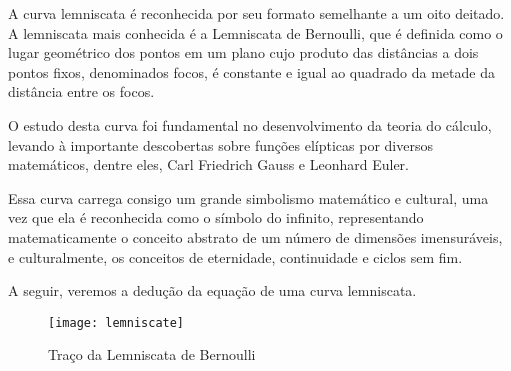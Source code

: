 \documentclass[../resumo.tex]{subfiles}
\begin{document}
	A curva lemniscata é reconhecida por seu formato semelhante a um oito deitado. A lemniscata mais conhecida é
	a Lemniscata de Bernoulli, que é definida como o lugar geométrico dos pontos em um plano cujo produto
	das distâncias a dois pontos fixos, denominados focos, é constante e igual ao quadrado da metade da distância
	entre os focos.

	O estudo desta curva foi fundamental no desenvolvimento da teoria do cálculo, levando à importante
	descobertas sobre funções elípticas por diversos matemáticos, dentre eles, Carl Friedrich Gauss e 
	Leonhard Euler.

	Essa curva carrega consigo um grande simbolismo matemático e cultural, uma vez que ela é reconhecida como
	o símbolo do infinito, representando matematicamente o conceito abstrato de um número de dimensões
	imensuráveis, e culturalmente, os conceitos de eternidade, continuidade e ciclos sem fim. 

	A seguir, veremos a dedução da equação de uma curva lemniscata.

	\begin{figure}[H]
			\centering
			\texttt{[image: lemniscate]}
			\caption{Traço da Lemniscata de Bernoulli}
	\end{figure}
\end{document}
